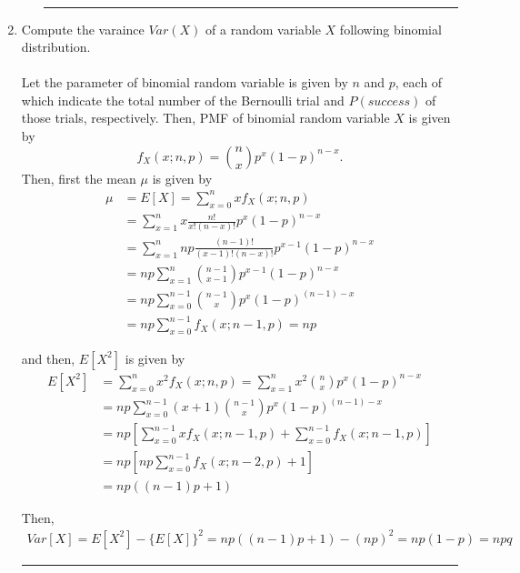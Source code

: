 \documentclass[twoside]{article}
\theoremstyle{definition}
\theoremstyle{remark}
\newenvironment{sol}{{\bf Solution:}}{\hfill\rule{2mm}{2mm}}
\begin{document}
\begin{enumerate}
\begin{enumerate}
\begin{sol}
\begin{equation}
\begin{split}
        \end{split}
      \end{equation}
    \end{sol}
  \end{enumerate}
  \clearpage
  \item Compute the varaince $Var(X)$ of a random variable $X$ following binomial
  distribution.\\
  \begin{sol}\\
    Let the parameter of binomial random variable is given by $n$ and $p$, each of
    which indicate the total number of the Bernoulli trial and $P(success)$ of
    those trials, respectively. Then, PMF of binomial random variable $X$ is given
    by
    \begin{equation}
      f_X(x; n, p) = \binom{n}{x} p^x {(1-p)}^{n-x}.
    \end{equation}
    Then, first the mean $\mu$ is given by
    \begin{equation}
      \begin{split}
        \mu
        &= E[X] = \sum_{x = 0}^{n} x f_X(x; n, p) \\
        &= \sum_{x = 1}^{n} x\frac{n!}{x! (n-x)!} p^x {(1-p)}^{n-x} \\
        &= \sum_{x = 1}^{n} np\frac{(n-1)!}{(x-1)! (n-x)!} p^{x-1} {(1-p)}^{n-x} \\
        &= np \sum_{x = 1}^{n} \binom{n-1}{x-1} p^{x-1} {(1-p)}^{n-x} \\
        &= np \sum_{x = 0}^{n-1} \binom{n-1}{x} p^{x} {(1-p)}^{(n-1)-x} \\
        &= np \sum_{x = 0}^{n-1} f_X(x; n-1, p) = np
      \end{split}
    \end{equation}

    and then, $E[X^2]$ is given by
    \begin{equation}
      \begin{split}
        E[X^2]
        &= \sum_{x=0}^{n} x^2 f_X(x; n, p) = \sum_{x = 1}^{n} x^2 \binom{n}{x} p^x {(1-p)}^{n-x} \\
        &= np \sum_{x = 0}^{n-1} (x+1) \binom{n-1}{x} p^{x} {(1-p)}^{(n-1)-x} \\
        &= np \left[ \sum_{x = 0}^{n-1} xf_X(x; n-1, p) + \sum_{x = 0}^{n-1} f_X(x; n-1, p) \right] \\
        &= np \left[ np \sum_{x = 0}^{n-1} f_X(x; n-2, p) + 1 \right] \\
        &= np((n-1)p + 1)
      \end{split}
    \end{equation}

    Then,
    \begin{equation}
      \begin{split}
        Var[X] = E[X^2] - {\{E[X]\}}^2 = np((n-1)p+1) - (np)^2 = np(1-p) = npq
      \end{split}
    \end{equation}
  \end{sol}
\end{enumerate}



\printbibliography

\end{document}
